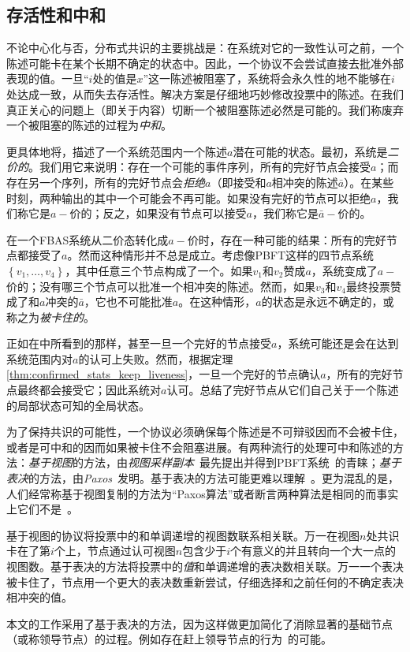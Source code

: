 \subsection{存活性和中和}\label{sec:vote_stuck}

不论中心化与否，分布式共识的主要挑战是：在系统对它的一致性认可之前，一个陈述可能卡在某个长期不确定的状态中。因此，一个协议不会尝试直接去批准外部表现的值。一旦``{\slot}$i$处的值是$x$''这一陈述被阻塞了，系统将会永久性的地不能够在{\slot}$i$处达成一致，从而失去存活性。解决方案是仔细地巧妙修改投票中的陈述。在我们真正关心的问题上（即关于{\slot}内容）切断一个被阻塞陈述必然是可能的。我们称废弃一个被阻塞的陈述的过程为\textit{中和}。

更具体地将，描述了一个系统范围内一个陈述$a$潜在可能的状态。最初，系统是\textit{二价的}。我们用它来说明：存在一个可能的事件序列，所有的完好节点会接受$a$；而存在另一个序列，所有的完好节点会\textit{拒绝}$a$（即接受和$a$相冲突的陈述$\bar a$）。在某些时刻，两种输出的其中一个可能会不再可能。如果没有完好的节点可以拒绝$a$，我们称它是$a-\!\!$价的；反之，如果没有节点可以接受$a$，我们称它是$\bar a-\!\!$价的。

在一个FBAS系统从二价态转化成$a-\!\!$价时，存在一种可能的结果：所有的完好节点都接受了$a$。然而这种情形并不总是成立。考虑像PBFT这样的四节点系统$\left\{v_1,\ldots,v_4\right\}$，其中任意三个节点构成了一个{\quorum}。如果$v_1$和$v_2$赞成$a$，系统变成了$a-\!\!$价的；没有哪三个节点可以批准一个相冲突的陈述。然而，如果$v_3$和$v_4$最终投票赞成了和$a$冲突的$\bar a$，它也不可能批准$a$。在这种情形，$a$的状态是永远不确定的，或称之为\textit{被卡住的}。

正如在中所看到的那样，甚至一旦一个完好的节点接受$a$，系统可能还是会在达到系统范围内对$a$的认可上失败。然而，根据定理\ref{thm:confirmed_stats_keep_liveness}，一旦一个完好的节点确认$a$，所有的完好节点最终都会接受它；因此系统对$a$认可。总结了完好节点从它们自己关于一个陈述的局部状态可知的全局状态。

为了保持共识的可能性，一个协议必须确保每个陈述是不可辩驳因而不会被卡住，或者是可中和的因而如果被卡住不会阻塞进展。有两种流行的处理可中和陈述的方法：\textit{基于视图}的方法，由\textit{视图采样副本}~\cite{Oki:1988:VRN:62546.62549}最先提出并得到PBFT系统~\cite{Castro:1999:PBFT}的青睐；\textit{基于表决}的方法，由\textit{Paxos}~\cite{Lamport:1998:PP:279227.279229}发明。基于表决的方法可能更难以理解~\cite{Ongaro:2014:SUC:2643634.2643666}。更为混乱的是，人们经常称基于视图复制的方法为``Paxos算法''或者断言两种算法是相同的而事实上它们不是~\cite{6894199}。

基于视图的协议将投票中的{\slot}和单调递增的视图数联系相关联。万一在视图$n$处共识卡在了第$i$个{\slot}上，节点通过认可视图$n$包含少于$i$个有意义的{\slot}并且转向一个大一点的视图数。基于表决的方法将投票中的\textit{值}和单调递增的表决数相关联。万一一个表决被卡住了，节点用一个更大的表决数重新尝试，仔细选择和之前任何的不确定表决相冲突的值。

本文的工作采用了基于表决的方法，因为这样做更加简化了消除显著的基础节点（或称领导节点）的过程。例如存在赶上领导节点的行为~\cite{Lamport:2011:BPR:2075029.2075058}的可能。

